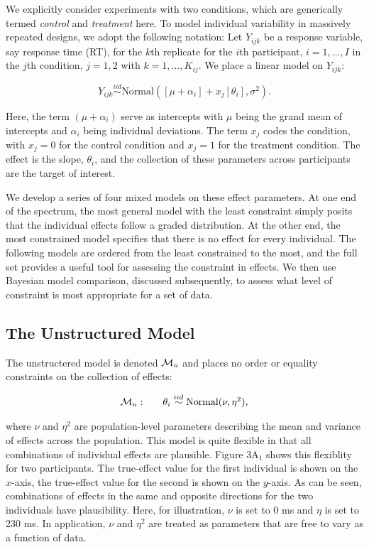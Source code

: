 \documentclass[american,man]{apa6}
\begin{document}
We explicitly consider experiments with two conditions, which are
generically termed \emph{control} and \emph{treatment} here. To model
individual variability in massively repeated designs, we adopt the
following notation: Let \(Y_{ijk}\) be a response variable, say response
time (RT), for the \(k\)th replicate for the \(i\)th participant,
\(i=1,\ldots,I\) in the \(j\)th condition, \(j=1,2\) with
\(k=1,\ldots,K_{ij}\). We place a linear model on \(Y_{ijk}\):

\begin{equation} \label{base1}
Y_{ijk} \stackrel{iid}{\sim} \mbox{Normal}\left([\mu+\alpha_i]+x_j[\theta_i],\sigma^2\right).
\end{equation}

Here, the term \((\mu+\alpha_i)\) serve as intercepts with \(\mu\) being
the grand mean of intercepts and \(\alpha_i\) being individual
deviations. The term \(x_j\) codes the condition, with \(x_j=0\) for the
control condition and \(x_j=1\) for the treatment condition. The effect
is the slope, \(\theta_i\), and the collection of these parameters
across participants are the target of interest.

We develop a series of four mixed models on these effect parameters. At
one end of the spectrum, the most general model with the least
constraint simply posits that the individual effects follow a graded
distribution. At the other end, the most constrained model specifies
that there is no effect for every individual. The following models are
ordered from the least constrained to the most, and the full set
provides a useful tool for assessing the constraint in effects. We then
use Bayesian model comparison, discussed subsequently, to assess what
level of constraint is most appropriate for a set of data.

\subsection{The Unstructured Model}\label{the-unstructured-model}

The unstructered model is denoted \({\cal M}_u\) and places no order or
equality constraints on the collection of effects:

\[
  \begin{array}{llr}
{\cal M}_u: && \theta_i \stackrel{iid}{\sim} \mbox{Normal}(\nu,\eta^2),\\
\end{array}
\]

where \(\nu\) and \(\eta^2\) are population-level parameters describing
the mean and variance of effects across the population. This model is
quite flexible in that all combinations of individual effects are
plausible. Figure 3\(\mbox{A}_1\) shows this flexiblity for two
participants. The true-effect value for the first individual is shown on
the \(x\)-axis, the true-effect value for the second is shown on the
\(y\)-axis. As can be seen, combinations of effects in the same and
opposite directions for the two individuals have plausibility. Here, for
illustration, \(\nu\) is set to 0 ms and \(\eta\) is set to 230 ms. In
application, \(\nu\) and \(\eta^2\) are treated as parameters that are
free to vary as a function of data.
\end{document}

